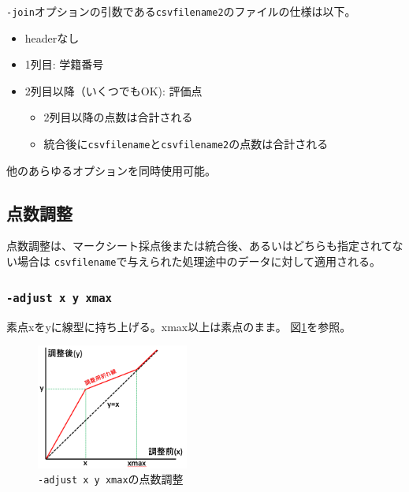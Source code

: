 \texttt{-join}オプションの引数である\texttt{csvfilename2}のファイルの仕様は以下。

\begin{itemize}
\item headerなし

\item 1列目: 学籍番号

\item 2列目以降（いくつでもOK): 評価点

\begin{itemize}
\item 2列目以降の点数は合計される

\item 統合後に\texttt{csvfilename}と\texttt{csvfilename2}の点数は合計される

\end{itemize}

\end{itemize}

他のあらゆるオプションを同時使用可能。

\subsection{点数調整}
\label{点数調整}

点数調整は、マークシート採点後または統合後、あるいはどちらも指定されてない場合は
\texttt{csvfilename}で与えられた処理途中のデータに対して適用される。

\subsubsection{\texttt{-adjust x y xmax}}
\label{-adjustxyxmax}

素点xをyに線型に持ち上げる。xmax以上は素点のまま。
図\ref{fig:adjust}を参照。

\begin{figure}[htbp]
\centering
\includegraphics[keepaspectratio,width=5cm,height=0.75\textheight]{fig/adjust.png}
\caption{\texttt{-adjust x y xmax}の点数調整}
\label{fig:adjust}
\end{figure}

